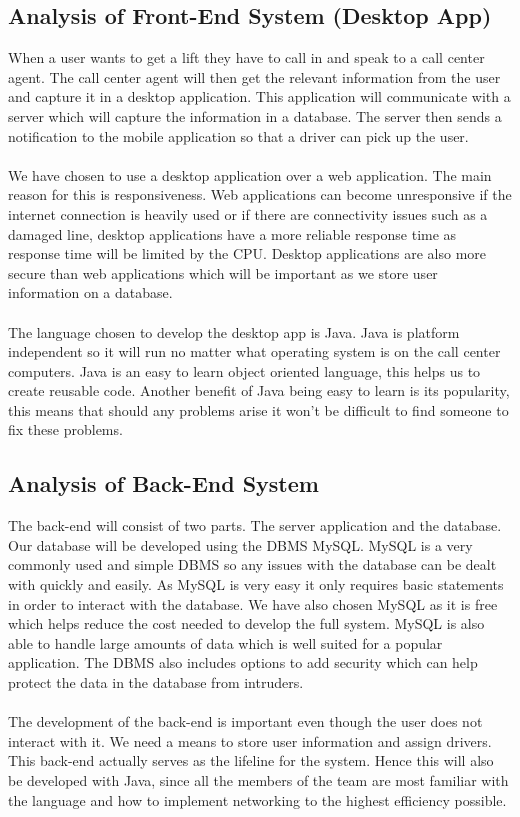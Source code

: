 \documentclass[a4paper,12pt]{article}
\begin{document}
\subsection{Analysis of Front-End System (Desktop App)}
When a user wants to get a lift they have to call in and speak to a call center agent. The call center agent will then get the relevant information from the user and capture it in a desktop application. This application will communicate with a server which will capture the information in a database. The server then sends a notification to the mobile application so that a driver can pick up the user.\\\\
We have chosen to use a desktop application over a web application. The main reason for this is responsiveness. Web applications can become unresponsive if the internet connection is heavily used or if there are connectivity issues such as a damaged line, desktop applications have a more reliable response time as response time will be limited by the CPU. Desktop applications are also more secure than web applications which will be important as we store user information on a database.\\\\
The language chosen to develop the desktop app is Java. Java is platform independent so it will run no matter what operating system is on the call center computers. Java is an easy to learn object oriented language, this helps us to create reusable code. Another benefit of Java being easy to learn is its popularity, this means that should any problems arise it won't be difficult to find someone to fix these problems.
\subsection{Analysis of Back-End System}
The back-end will consist of two parts. The server application and the database.
Our database will be developed using the DBMS MySQL. MySQL is a very commonly used and simple DBMS so any issues with the database can be dealt with quickly and easily. As MySQL is very easy it only requires basic statements in order to interact with the database. We have also chosen MySQL as it is free which helps reduce the cost needed to develop the full system. MySQL is also able to handle large amounts of data which is well suited for a popular application. The DBMS also includes options to add security which can help protect the data in the database from intruders.
\\\\
The development of the back-end is important even though the user does not interact with it. We need a means to store user information and assign drivers. This back-end actually serves as the lifeline for the system. Hence this will also be developed with Java, since all the members of the team are most familiar with the language and how to implement networking to the highest efficiency possible.
\end{document}
